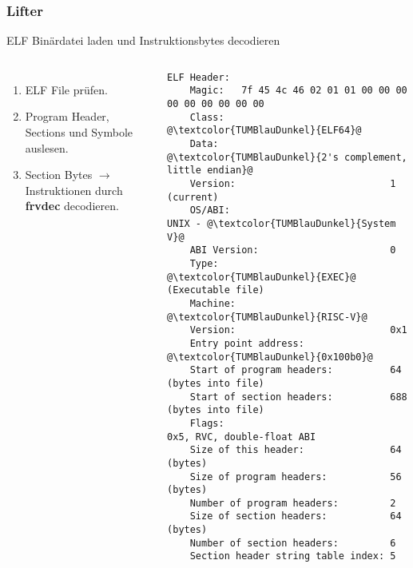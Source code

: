 
\begin{frame}[fragile]
    \frametitle{Lifter}{ELF Binärdatei laden und Instruktionsbytes decodieren}
    \begin{columns}[c]
        \begin{enumerate}
            \item ELF File prüfen.
            \item Program Header, Sections und Symbole auslesen.
            \item Section Bytes $\rightarrow$ Instruktionen durch \textbf{frvdec} decodieren.
        \end{enumerate}
        \begin{lstlisting}[basicstyle=\footnotesize, breaklines=true, escapeinside={@@}]
ELF Header:
    Magic:   7f 45 4c 46 02 01 01 00 00 00 00 00 00 00 00 00
    Class:                             @\textcolor{TUMBlauDunkel}{ELF64}@
    Data:                              @\textcolor{TUMBlauDunkel}{2's complement, little endian}@
    Version:                           1 (current)
    OS/ABI:                            UNIX - @\textcolor{TUMBlauDunkel}{System V}@
    ABI Version:                       0
    Type:                              @\textcolor{TUMBlauDunkel}{EXEC}@ (Executable file)
    Machine:                           @\textcolor{TUMBlauDunkel}{RISC-V}@
    Version:                           0x1
    Entry point address:               @\textcolor{TUMBlauDunkel}{0x100b0}@
    Start of program headers:          64 (bytes into file)
    Start of section headers:          688 (bytes into file)
    Flags:                             0x5, RVC, double-float ABI
    Size of this header:               64 (bytes)
    Size of program headers:           56 (bytes)
    Number of program headers:         2
    Size of section headers:           64 (bytes)
    Number of section headers:         6
    Section header string table index: 5
        \end{lstlisting}
    \end{columns}
\end{frame}
\clearpage


